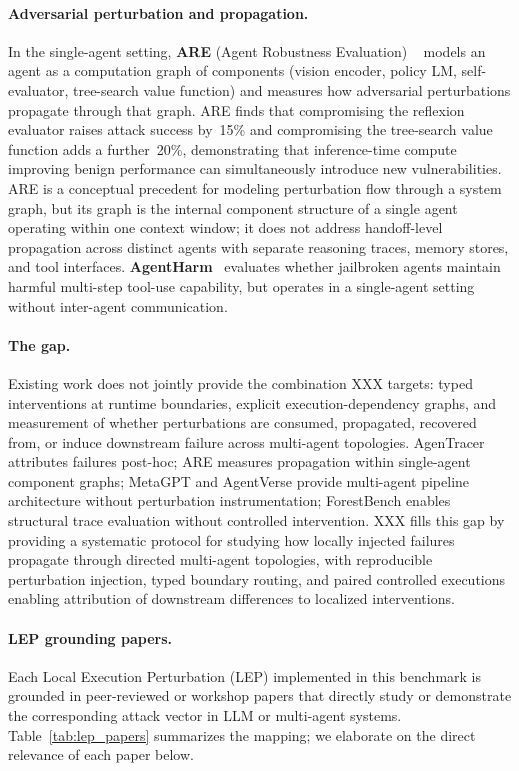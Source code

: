 \paragraph{Adversarial perturbation and propagation.}
In the single-agent setting, \textbf{ARE} (Agent Robustness Evaluation)
~\citep{ma2024are} models an agent as a computation graph of components
(vision encoder, policy LM, self-evaluator, tree-search value function)
and measures how adversarial perturbations propagate through that graph.
ARE finds that compromising the reflexion evaluator raises attack success
by~15\% and compromising the tree-search value function adds a further~20\%,
demonstrating that inference-time compute improving benign performance can
simultaneously introduce new vulnerabilities. ARE is a conceptual
precedent for modeling perturbation flow through a system graph, but its
graph is the internal component structure of a single agent operating
within one context window; it does not address handoff-level propagation
across distinct agents with separate reasoning traces, memory stores, and
tool interfaces. \textbf{AgentHarm}~\citep{andriushchenko2024agentharm}
evaluates whether jailbroken agents maintain harmful multi-step tool-use
capability, but operates in a single-agent setting without inter-agent
communication.

\paragraph{The gap.}
Existing work does not jointly provide the combination XXX targets:
typed interventions at runtime boundaries, explicit execution-dependency
graphs, and measurement of whether perturbations are consumed, propagated,
recovered from, or induce downstream failure across multi-agent topologies.
AgenTracer attributes failures post-hoc; ARE measures propagation within
single-agent component graphs; MetaGPT and AgentVerse provide multi-agent
pipeline architecture without perturbation instrumentation; ForestBench
enables structural trace evaluation without controlled intervention. XXX
fills this gap by providing a systematic protocol for studying how locally
injected failures propagate through directed multi-agent topologies,
with reproducible perturbation injection, typed boundary routing, and
paired controlled executions enabling attribution of downstream differences
to localized interventions.

\paragraph{LEP grounding papers.}
Each Local Execution Perturbation (LEP) implemented in this benchmark is
grounded in peer-reviewed or workshop papers that directly study or
demonstrate the corresponding attack vector in LLM or multi-agent systems.
Table~\ref{tab:lep_papers} summarizes the mapping; we elaborate on the
direct relevance of each paper below.


